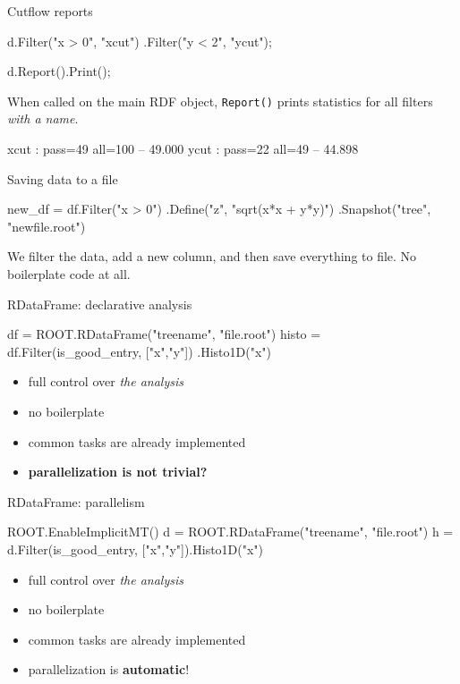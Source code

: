 \documentclass[aspectratio=169]{beamer}
\begin{document}
\begin{frame}[fragile]{Cutflow reports}
\begin{pycell}
d.Filter("x > 0", "xcut")
 .Filter("y < 2", "ycut");

d.Report().Print();
\end{pycell}
When called on the main RDF object, \texttt{Report()} prints
statistics for all ﬁlters \textit{with a name}.
\begin{cellout}
xcut     : pass=49     all=100     --     49.000 %
ycut     : pass=22     all=49      --     44.898 %
\end{cellout}
\end{frame}

\begin{frame}[fragile]{Saving data to a file}
    \begin{pycell}
new_df = df.Filter("x > 0")
           .Define("z", "sqrt(x*x + y*y)")
           .Snapshot("tree", "newfile.root")
    \end{pycell}
We ﬁlter the data, add a new column, and then save
everything to ﬁle. No boilerplate code at all.
\end{frame}

\begin{frame}[fragile]{RDataFrame: declarative analysis}
    \begin{pycell}
df = ROOT.RDataFrame("treename", "file.root")
histo = df.Filter(is_good_entry, ["x","y"])
          .Histo1D("x")
    \end{pycell}
\begin{itemize}
    \item{full control over \textit{the analysis}}
    \item{no boilerplate}
    \item{common tasks are already implemented}
    \item{\textbf{parallelization is not trivial?}}
\end{itemize}
\end{frame}

\begin{frame}[fragile]{RDataFrame: parallelism}
\begin{pycell}
ROOT.EnableImplicitMT()
d = ROOT.RDataFrame("treename", "file.root")
h = d.Filter(is_good_entry, ["x","y"]).Histo1D("x")
\end{pycell}
\begin{itemize}
    \item{full control over \textit{the analysis}}
    \item{no boilerplate}
    \item{common tasks are already implemented}
    \item{parallelization is \textbf{automatic}!}
\end{itemize}
\end{frame}
\end{document}
